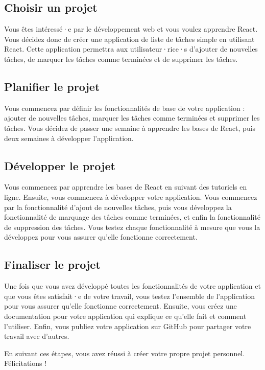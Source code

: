 \subsection{Choisir un projet}

Vous êtes intéressé·e par le développement web et vous voulez apprendre React. Vous décidez donc de créer une application de liste de tâches simple en utilisant React. Cette application permettra aux utilisateur·rice·s d'ajouter de nouvelles tâches, de marquer les tâches comme terminées et de supprimer les tâches.

\subsection{Planifier le projet}

Vous commencez par définir les fonctionnalités de base de votre application : ajouter de nouvelles tâches, marquer les tâches comme terminées et supprimer les tâches. Vous décidez de passer une semaine à apprendre les bases de React, puis deux semaines à développer l'application.

\subsection{Développer le projet}

Vous commencez par apprendre les bases de React en suivant des tutoriels en ligne. Ensuite, vous commencez à développer votre application. Vous commencez par la fonctionnalité d'ajout de nouvelles tâches, puis vous développez la fonctionnalité de marquage des tâches comme terminées, et enfin la fonctionnalité de suppression des tâches. Vous testez chaque fonctionnalité à mesure que vous la développez pour vous assurer qu'elle fonctionne correctement.

\subsection{Finaliser le projet}

Une fois que vous avez développé toutes les fonctionnalités de votre application et que vous êtes satisfait·e de votre travail, vous testez l'ensemble de l'application pour vous assurer qu'elle fonctionne correctement. Ensuite, vous créez une documentation pour votre application qui explique ce qu'elle fait et comment l'utiliser. Enfin, vous publiez votre application sur GitHub pour partager votre travail avec d'autres.

En suivant ces étapes, vous avez réussi à créer votre propre projet personnel. Félicitations !